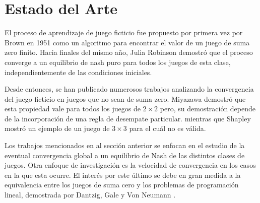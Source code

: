 \chapter{Estado del Arte}  \label{cap:relwork}


El proceso de aprendizaje de juego ficticio fue propuesto por primera vez por Brown en 1951 \cite{brown:1951} como un algoritmo para encontrar el valor de un juego de suma zero finito. Hacia finales del mismo año, Julia Robinson \cite{robinson:zerosum} demostró que el proceso converge a un equilibrio de nash puro para todos los juegos de esta clase, independientemente de las condiciones iniciales.

Desde entonces, se han publicado numerosos trabajos analizando la convergencia del juego ficticio en juegos que no sean de suma zero. Miyazawa \cite{miyazawa:2x2} demostró que esta propiedad vale para todos los juegos de $2 \times 2$ pero, su demostración depende de la incorporación de una regla de desempate particular. mientras que Shapley \cite{shapley:3x3} mostró un ejemplo de un juego de $3 \times 3$ para el cuál no es válida.





Los trabajos mencionados en al sección anterior se enfocan en el estudio de la eventual convergencia global
a un equilibrio de Nash de las distintos clases de juegos. Otra enfoque de investigación es la velocidad de
convergencia en los casos en la que esta ocurre.
El interés por este último se debe en gran medida a la equivalencia entre los juegos de suma cero y
los problemas de programación lineal, demostrada por Dantzig, Gale y Von Neumann \cite{fplp:equiv}.